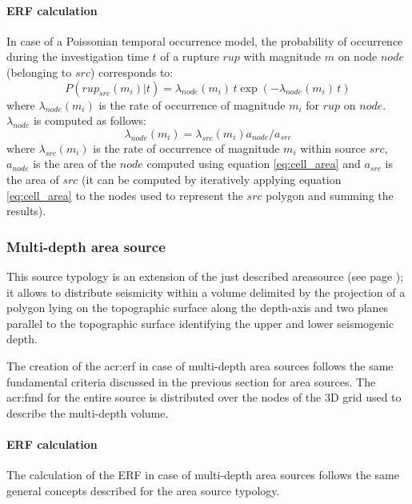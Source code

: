 \paragraph{ERF calculation}
In case of a Poissonian temporal occurrence model, the probability of 
occurrence during the investigation time $t$ of a rupture $rup$ with 
magnitude $m$ on node $node$ (belonging to $src$) corresponds to:
\begin{equation}
P(rup_{src}(m_i)|t)=\lambda_{node}(m_i)\,t\exp(-\lambda_{node}(m_i)\,t)
\end{equation}
where $\lambda_{node}(m_i)$ is the rate of occurrence of magnitude $m_i$ 
for $rup$ on $node$. $\lambda_{node}$ is computed as follows:
\[ 
\lambda_{node}(m_i) = \lambda_{src}(m_i)a_{node}/a_{src}
\]
%
where $\lambda_{src}(m_i)$ is the rate of occurrence of magnitude $m_i$
within source $src$, $a_{node}$ is the area of the $node$ computed using
equation \ref{eq:cell_area} and $a_{src}$ is the area of $src$ (it can be
computed by iteratively applying equation \ref{eq:cell_area} to the 
nodes used to represent the $src$ polygon and summing the results). 
%
\subsubsection{Multi-depth area source}
%
%
This source typology is an extension of the just described 
\gls{areasource} (see page \pageref{sec:areasource});
it allows to distribute seismicity within a volume delimited by the 
projection of a polygon lying on the topographic surface along the 
depth-axis and two planes parallel to the topographic surface 
identifying the upper and lower seismogenic depth.

The creation of the \gls{acr:erf} in case of multi-depth area sources
follows the same fundamental criteria discussed in the previous section 
for area sources. 
%
The \gls{acr:fmd} for the entire source is distributed over the nodes 
of the 3D grid used to describe the multi-depth volume.
%
\paragraph{ERF calculation}
The calculation of the ERF in case of multi-depth area sources follows
the same general concepts described for the area source typology.
%
